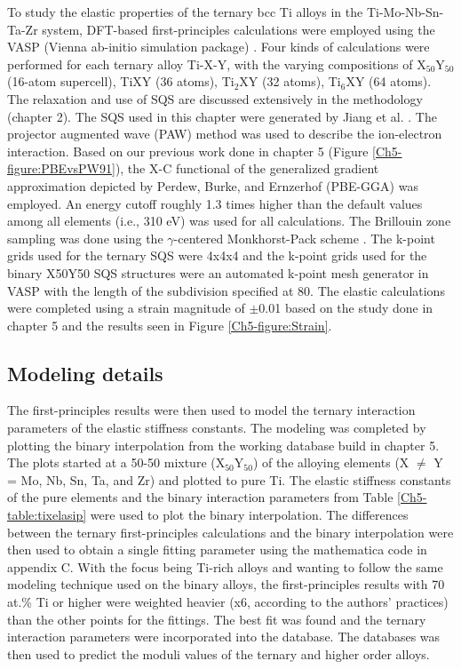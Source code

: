 To study the elastic properties of the ternary bcc Ti alloys in the Ti-Mo-Nb-Sn-Ta-Zr system, DFT-based first-principles calculations were employed using the VASP (Vienna ab-initio simulation package) \cite{Kresse1996,Kresse1999}. Four kinds of calculations were performed for each ternary alloy Ti-X-Y, with the varying compositions of X$_{50}$Y$_{50}$ (16-atom supercell), TiXY (36 atoms), Ti$_{2}$XY (32 atoms), Ti$_{6}$XY (64 atoms). The relaxation and use of SQS are discussed extensively in the methodology (chapter 2). The SQS used in this chapter were generated by Jiang et al. \cite{Jiang2004,Jiang2009}. The projector augmented wave (PAW) method was used to describe the ion-electron interaction. Based on our previous work done in chapter 5 (Figure \ref{Ch5-figure:PBEvsPW91}), the X-C functional of the generalized gradient approximation depicted by Perdew, Burke, and Ernzerhof (PBE-GGA) \cite{Perdew1996a} was employed. An energy cutoff roughly 1.3 times higher than the default values among all elements (i.e., 310 eV) was used for all calculations. The Brillouin zone sampling was done using the $\gamma$-centered Monkhorst-Pack scheme \cite{Monkhorst1976a}. The k-point grids used for the ternary SQS were 4x4x4 and the k-point grids used for the binary X50Y50 SQS structures were an automated k-point mesh generator in VASP with the length of the subdivision specified at 80. The elastic calculations were completed using a strain magnitude of $\pm$0.01 based on the study done in chapter 5 and the results seen in Figure \ref{Ch5-figure:Strain}.

\subsection{Modeling details}

The first-principles results were then used to model the ternary interaction parameters of the elastic stiffness constants. The modeling was completed by plotting the binary interpolation from the working database build in chapter 5. The plots started at a 50-50 mixture (X$_{50}$Y$_{50}$) of the alloying elements (X $\neq$ Y = Mo, Nb, Sn, Ta, and Zr) and plotted to pure Ti. The elastic stiffness constants of the pure elements and the binary interaction parameters from Table \ref{Ch5-table:tixelasip} were used to plot the binary interpolation. The differences between the ternary first-principles calculations and the binary interpolation were then used to obtain a single fitting parameter using the mathematica code in appendix C. With the focus being Ti-rich alloys and wanting to follow the same modeling technique used on the binary alloys, the first-principles results with 70 at.\% Ti or higher were weighted heavier (x6, according to the authors' practices) than the other points for the fittings. The best fit was found and the ternary interaction parameters were incorporated into the database. The databases was then used to predict the moduli values of the ternary and higher order alloys. 

